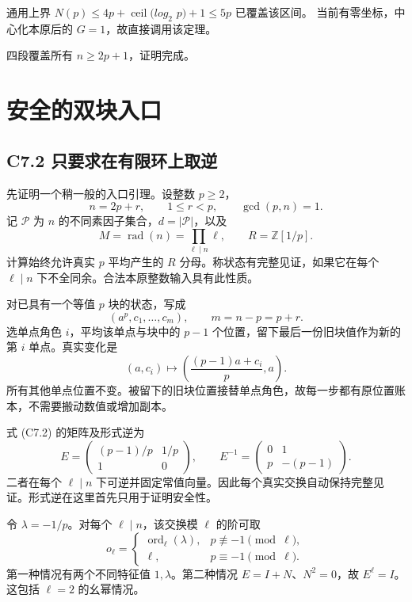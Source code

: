 {通用上界} {\ensuremath{N(p)\le 4p+\operatorname{ceil}(log_{2}}} {\ensuremath{p)+1\le 5p}} {已覆盖该区间。} {当前有零坐标，中心化本原后的} {\ensuremath{G=1}，故直接调用该定理。}

{四段覆盖所有} {\ensuremath{n\ge 2p+1}，证明完成。}


\section{安全的双块入口}\label{construct:entry}
\subsection*{\texorpdfstring{{C7.2} {只要求在有限环上取逆}}{C7.2 只要求在有限环上取逆}}\label{C7-h40}

{先证明一个稍一般的入口引理。设整数} \(p\ge2\){，} \[
n=2p+r,\qquad1\le r<p,\qquad\gcd(p,n)=1.
\] {记} \(\mathcal P\) {为} \(n\) {的不同素因子集合，}\(d=|\mathcal P|\){，以及} \[
M=\operatorname{rad}(n)=\prod_{\ell\mid n}\ell,\qquad R=\mathbb Z[1/p].
\] {计算始终允许真实} \(p\) {平均产生的} \(R\) {分母。称状态有完整见证，如果它在每个} \(\ell\mid n\) {下不全同余。合法本原整数输入具有此性质。}

{对已具有一个等值} \(p\) {块的状态，写成} \[
(a^p,c_1,\ldots,c_m),\qquad m=n-p=p+r.
\] {选单点角色} \(i\){，平均该单点与块中的} \(p-1\) {个位置，留下最后一份旧块值作为新的第} \(i\) {单点。真实变化是} \[
(a,c_i)\longmapsto\left(\frac{(p-1)a+c_i}{p},a\right).\tag{C7.2}
\] {所有其他单点位置不变。被留下的旧块位置接替单点角色，故每一步都有原位置账本，不需要搬动数值或增加副本。}

{式} {(C7.2)} {的矩阵及形式逆为} \[
E=\begin{pmatrix}(p-1)/p&1/p\\1&0\end{pmatrix},
\qquad E^{-1}=\begin{pmatrix}0&1\\p&-(p-1)\end{pmatrix}.
\] {二者在每个} \(\ell\mid n\) {下可逆并固定常值向量。因此每个真实交换自动保持完整见证。形式逆在这里首先只用于证明安全性。}

{令} \(\lambda=-1/p\){。对每个} \(\ell\mid n\){，该交换模} \(\ell\) {的阶可取} \[
o_\ell=
\begin{cases}
\operatorname{ord}_\ell(\lambda),&p\not\equiv-1\pmod\ell,\\
\ell,&p\equiv-1\pmod\ell.
\end{cases}
\] {第一种情况有两个不同特征值} \(1,\lambda\){。第二种情况} \(E=I+N\){、}\(N^2=0\){，故} \(E^\ell=I\){。这包括} \(\ell=2\) {的幺幂情况。}

